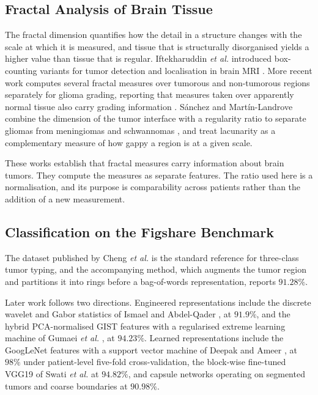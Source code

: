 \documentclass[journal]{IEEEtran}
\begin{document}
\subsection{Fractal Analysis of Brain Tissue}
The fractal dimension quantifies how the detail in a structure changes with the
scale at which it is measured, and tissue that is structurally disorganised
yields a higher value than tissue that is regular. Iftekharuddin \emph{et al.}
introduced box-counting variants for tumor detection and localisation in brain
MRI \cite{iftekhar2003}. More recent work computes several fractal measures over
tumorous and non-tumorous regions separately for glioma grading, reporting that
measures taken over apparently normal tissue also carry grading information
\cite{frontiers2023}. Sánchez and Martín-Landrove combine the dimension of the
tumor interface with a regularity ratio to separate gliomas from meningiomas and
schwannomas \cite{martin2022}, and treat lacunarity as a complementary measure of
how gappy a region is at a given scale.

These works establish that fractal measures carry information about brain tumors.
They compute the measures as separate features. The ratio used here is a
normalisation, and its purpose is comparability across patients rather than the
addition of a new measurement.

\subsection{Classification on the Figshare Benchmark}
The dataset published by Cheng \emph{et al.} \cite{cheng2015} is the standard
reference for three-class tumor typing, and the accompanying method, which
augments the tumor region and partitions it into rings before a bag-of-words
representation, reports $91.28\%$.

Later work follows two directions. Engineered representations include the
discrete wavelet and Gabor statistics of Ismael and Abdel-Qader
\cite{ismael2018}, at $91.9\%$, and the hybrid PCA-normalised GIST features with
a regularised extreme learning machine of Gumaei \emph{et al.}
\cite{gumaei2019}, at $94.23\%$. Learned representations include the GoogLeNet
features with a support vector machine of Deepak and Ameer \cite{deepak2019}, at
$98\%$ under patient-level five-fold cross-validation, the block-wise fine-tuned
VGG19 of Swati \emph{et al.} \cite{swati2019} at $94.82\%$, and capsule networks
operating on segmented tumors and coarse boundaries \cite{afshar2019} at
$90.98\%$.
\end{document}
